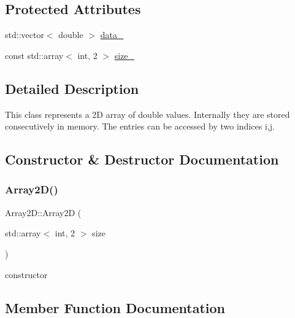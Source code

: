 \subsection*{Protected Attributes}
\begin{DoxyCompactItemize}
\item 
std\+::vector$<$ double $>$ \mbox{\hyperlink{classArray2D_af1572f75d219caab4b2372a98341b991}{data\+\_\+}}
\item 
const std\+::array$<$ int, 2 $>$ \mbox{\hyperlink{classArray2D_a6494778c15c3feb46e6299aa2e0bd3c6}{size\+\_\+}}
\end{DoxyCompactItemize}


\subsection{Detailed Description}
This class represents a 2D array of double values. Internally they are stored consecutively in memory. The entries can be accessed by two indices i,j. 

\subsection{Constructor \& Destructor Documentation}
\mbox{\label{classArray2D_a16521417dfdf67ec694bfb7747df9000}} 
\subsubsection{\texorpdfstring{Array2D()}{Array2D()}}
{\footnotesize\ttfamily Array2\+D\+::\+Array2D (\begin{DoxyParamCaption}\item[{std\+::array$<$ int, 2 $>$}]{size }\end{DoxyParamCaption})\hspace{0.3cm}{\ttfamily [explicit]}}



constructor 



\subsection{Member Function Documentation}
\mbox{\label{classArray2D_a9d49e5544f4acf51a57dcbb0ed1bb0f8}} 
